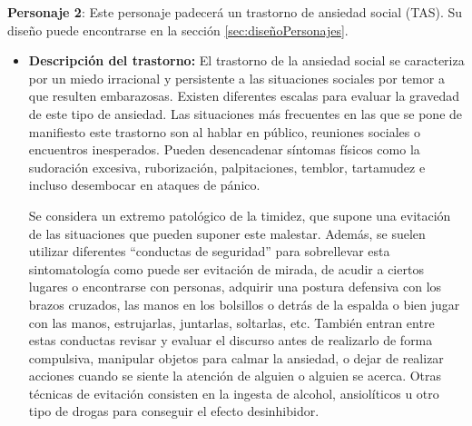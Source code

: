 \documentclass[12pt, a4paper,twoside,titlepage]{book}
\begin{document}
\textbf{Personaje 2}: Este personaje padecerá un trastorno de ansiedad social (TAS). Su diseño puede encontrarse en la sección \ref{sec:diseñoPersonajes}.

\begin{itemize}
    \item {\textbf{Descripción del trastorno:}
     El trastorno de la ansiedad social se caracteriza por un miedo irracional y persistente a las situaciones sociales por temor a que resulten embarazosas. Existen diferentes escalas para evaluar la gravedad de este tipo de ansiedad. Las situaciones más frecuentes en las que se pone de manifiesto este trastorno son al hablar en público, reuniones sociales o encuentros inesperados. Pueden desencadenar síntomas físicos como la sudoración excesiva, ruborización, palpitaciones, temblor, tartamudez e incluso desembocar en ataques de pánico. 
     
     Se considera un extremo patológico de la timidez, que supone una evitación de las situaciones que pueden suponer este malestar. Además, se suelen utilizar diferentes “conductas de seguridad” para sobrellevar esta sintomatología como puede ser evitación de mirada, de acudir a ciertos lugares o encontrarse con personas, adquirir una postura defensiva con los brazos cruzados, las manos en los bolsillos o detrás de la espalda o bien jugar con las manos, estrujarlas, juntarlas, soltarlas, etc. También entran entre estas conductas revisar y evaluar el discurso antes de realizarlo de forma compulsiva, manipular objetos para calmar la ansiedad, o dejar de realizar acciones cuando se siente la atención de alguien o alguien se acerca. Otras técnicas de evitación consisten en la ingesta de alcohol, ansiolíticos u otro tipo de drogas para conseguir el efecto desinhibidor.  
     
}
\end{itemize}
\end{document}
